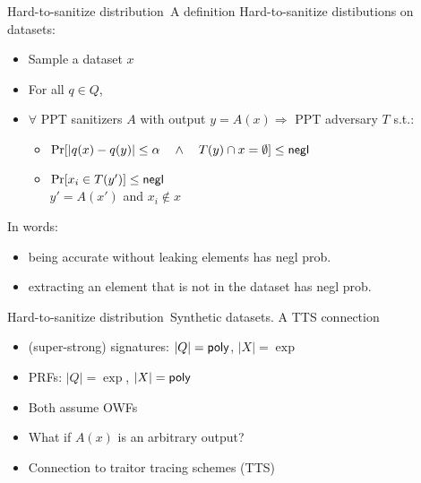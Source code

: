 \begin{frame}{Hard-to-sanitize distribution~\cite{conf/stoc/DworkNRRV09}}{A definition}
  Hard-to-sanitize distibutions on datasets:
  \begin{itemize}
  \item Sample a dataset $x$ 
  \item For all $q \in Q$,
  \item $\forall$ PPT sanitizers $A$ with output $y=A(x) \Longrightarrow$  PPT adversary $T$ s.t.:
    \begin{itemize}
    \item $\Pr[ |q(x) - q(y)| \leq \alpha \quad \land \quad T(y) \cap x = \emptyset] \leq \mathsf{negl}$
    \item $\Pr [ x_i \in T(y') ] \leq \mathsf{negl}$
          \\ $y' = A(x')$ and $x_i \not\in x$
    \end{itemize}
  \end{itemize}

  In words:
  \begin{itemize}
    \item being accurate without leaking elements has negl prob.
    \item extracting an element that is not in the dataset has negl prob.
  \end{itemize}
\end{frame}


\begin{frame}{Hard-to-sanitize
    distribution~\cite{conf/stoc/DworkNRRV09}}{Synthetic datasets. A TTS connection}
  \begin{itemize}
    \item (super-strong) signatures: $|Q| = \mathsf{poly}$, $|X| = \exp$
    \item PRFs: $|Q| = \exp$, $|X| = \mathsf{poly}$
    \item Both assume OWFs
    \end{itemize}

    \begin{itemize}
        \item What if $A(x)$ is an arbitrary output?
        \item Connection to traitor tracing schemes (TTS)~\cite{Chor94tracingtraitors}
    \end{itemize}
\end{frame}

